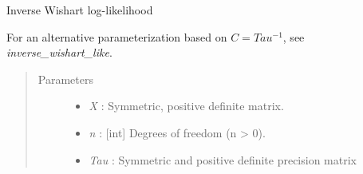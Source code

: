 \documentclass[letterpaper,10pt,english]{sphinxmanual}
\begin{document}
\begin{fulllineitems}
\label{distributions:pymc.distributions.inverse_wishart_prec_like}
Inverse Wishart log-likelihood

For an alternative parameterization based on $C=Tau^{-1}$, see
\emph{inverse\_wishart\_like}.
\begin{quote}\begin{description}
\item[{Parameters }] \leavevmode\begin{itemize}
\item {} 
\emph{X} : Symmetric, positive definite matrix.

\item {} 
\emph{n} : {[}int{]} Degrees of freedom (n \textgreater{} 0).

\item {} 
\emph{Tau} : Symmetric and positive definite precision matrix

\end{itemize}

\end{description}\end{quote}

\end{fulllineitems}

\end{document}
